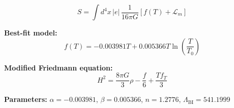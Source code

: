 
\begin{equation}
  S = \int d^4x \, |e| \, \frac{1}{16\pi G} \left[ f(T) + \mathcal{L}_m \right]
\end{equation}

\textbf{Best-fit model:}
\begin{equation}
  f(T) = -0.003981 T + 0.005366 T \ln\!\left(\frac{T}{T_0}\right)
\end{equation}

\textbf{Modified Friedmann equation:}
\begin{equation}
  H^2 = \frac{8\pi G}{3} \rho - \frac{f}{6} + \frac{T f_T}{3}
\end{equation}

\textbf{Parameters:}
$\alpha = -0.003981$, \quad
$\beta = 0.005366$, \quad
$n = 1.2776$, \quad
$\Lambda_{\text{BI}} = 541.1999$